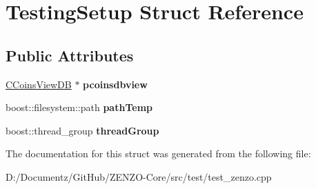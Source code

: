 \hypertarget{struct_testing_setup}{}\section{Testing\+Setup Struct Reference}
\label{struct_testing_setup}
\subsection*{Public Attributes}
\begin{DoxyCompactItemize}
\item 
\mbox{\label{struct_testing_setup_aa2a38ad37e6f135c4dcc56be35474afb}} 
\mbox{\hyperlink{class_c_coins_view_d_b}{C\+Coins\+View\+DB}} $\ast$ {\bfseries pcoinsdbview}
\item 
\mbox{\label{struct_testing_setup_ae209499b85cae3e564bcf311692ff009}} 
boost\+::filesystem\+::path {\bfseries path\+Temp}
\item 
\mbox{\label{struct_testing_setup_adb1cab11de94a3b08a682987d039e1ec}} 
boost\+::thread\+\_\+group {\bfseries thread\+Group}
\end{DoxyCompactItemize}


The documentation for this struct was generated from the following file\+:\begin{DoxyCompactItemize}
\item 
D\+:/\+Documentz/\+Git\+Hub/\+Z\+E\+N\+Z\+O-\/\+Core/src/test/test\+\_\+zenzo.\+cpp\end{DoxyCompactItemize}
